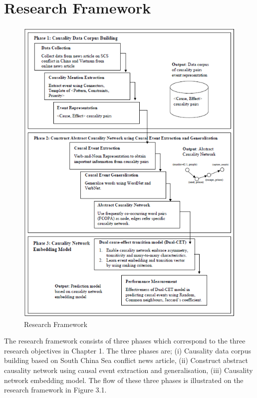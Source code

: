 \documentclass[twoside]{utmthesis}
\begin{document}
\section{Research Framework}
\begin{figure}[H]
	\centering
	\includegraphics[width=1.0\linewidth,height=0.9\textheight]{"diagram/Research Framework"}
	\caption{Research Framework}
	\label{fig:research-framework2}
\end{figure}

The research framework consists of three phases which correspond to the three research objectives in Chapter 1. The three phases are; (i) Causality data corpus building based on South China Sea conflict news article, (ii) Construct abstract causality network using causal event extraction and generalisation, (iii) Causality network embedding model. The flow of these three phases is illustrated on the research framework in Figure 3.1.
\end{document}
